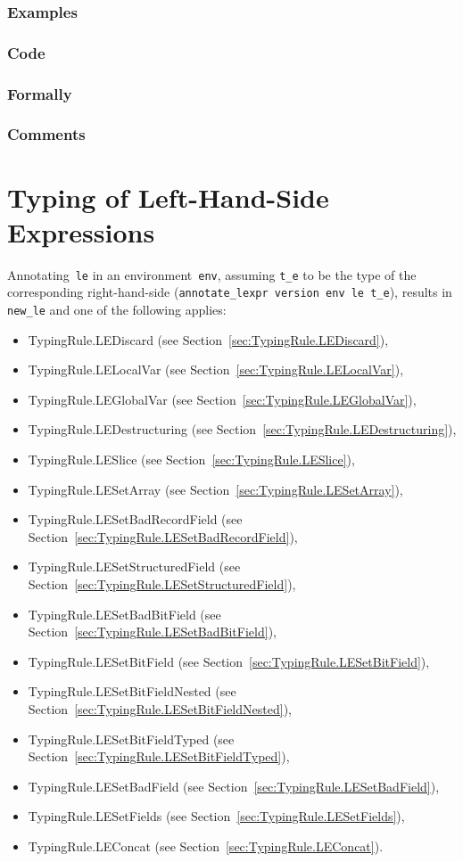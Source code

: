 \documentclass{book}
\begin{document}
  \subsection{Examples}

  \subsection{Code}

  \subsection{Formally}

  \subsection{Comments}


\chapter{Typing of Left-Hand-Side Expressions}
Annotating~\texttt{le} in an environment~\texttt{env}, assuming \texttt{t\_e}
to be the type of the corresponding right-hand-side (\texttt{annotate\_lexpr
version env le t\_e}), results in \texttt{new\_le} and one of the following
applies:
\begin{itemize}
\item TypingRule.LEDiscard (see Section~\ref{sec:TypingRule.LEDiscard}),
\item TypingRule.LELocalVar (see Section~\ref{sec:TypingRule.LELocalVar}),
\item TypingRule.LEGlobalVar (see Section~\ref{sec:TypingRule.LEGlobalVar}),
\item TypingRule.LEDestructuring (see Section~\ref{sec:TypingRule.LEDestructuring}),
\item TypingRule.LESlice (see Section~\ref{sec:TypingRule.LESlice}),
\item TypingRule.LESetArray (see Section~\ref{sec:TypingRule.LESetArray}),
\item TypingRule.LESetBadRecordField (see Section~\ref{sec:TypingRule.LESetBadRecordField}),
\item TypingRule.LESetStructuredField (see Section~\ref{sec:TypingRule.LESetStructuredField}),
\item TypingRule.LESetBadBitField (see Section~\ref{sec:TypingRule.LESetBadBitField}),
\item TypingRule.LESetBitField (see Section~\ref{sec:TypingRule.LESetBitField}),
\item TypingRule.LESetBitFieldNested (see Section~\ref{sec:TypingRule.LESetBitFieldNested}),
\item TypingRule.LESetBitFieldTyped (see Section~\ref{sec:TypingRule.LESetBitFieldTyped}),
\item TypingRule.LESetBadField (see Section~\ref{sec:TypingRule.LESetBadField}),
\item TypingRule.LESetFields (see Section~\ref{sec:TypingRule.LESetFields}),
\item TypingRule.LEConcat (see Section~\ref{sec:TypingRule.LEConcat}).
\end{itemize}
\end{document}
